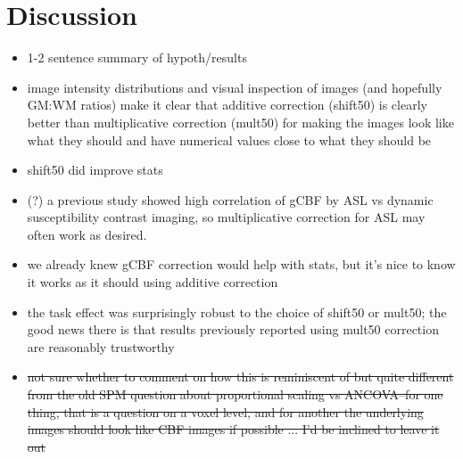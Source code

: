 \section{Discussion}

\begin{itemize}
\item 1-2 sentence summary of hypoth/results
\item image intensity distributions and visual inspection of images (and hopefully GM:WM ratios) make it clear that additive correction (shift50) is clearly better than multiplicative correction (mult50) for making the images look like what they should and have numerical values close to what they should be
\item shift50 did improve stats
\item (?) a previous study showed high correlation of gCBF by ASL vs dynamic susceptibility contrast imaging, so multiplicative correction for ASL may often work as desired.\cite{Knutsson_2010}
\item we already knew gCBF correction would help with stats,\cite{22789842} but it's nice to know it works as it should using additive correction
\item the task effect was surprisingly robust to the choice of shift50 or mult50; the good news there is that results previously reported using  mult50 correction are reasonably trustworthy
\item \sout{not sure whether to comment on how this is reminiscent of but quite different from the old SPM question about proportional scaling vs ANCOVA--for one thing, that is a question on a voxel level, and for another the underlying images should look like CBF images if possible ... I'd be inclined to leave it out}
\end{itemize}

